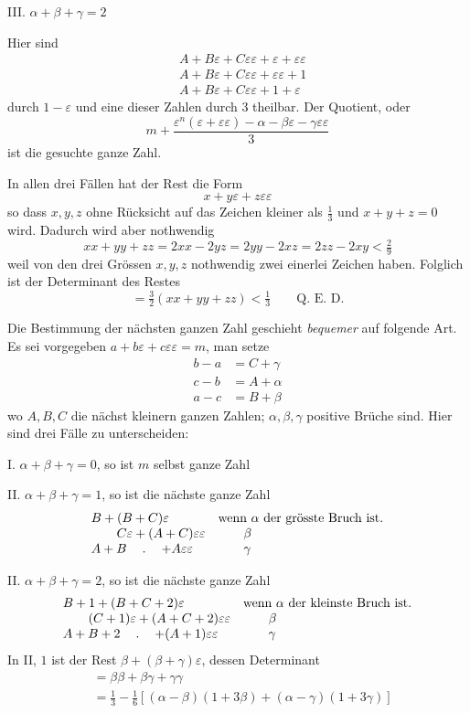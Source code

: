 III. $\alpha+\beta+\gamma=2$

Hier sind
\[
\begin{aligned}
&A+B\varepsilon+C\varepsilon\varepsilon+\varepsilon+\varepsilon\varepsilon\\
&A+B\varepsilon+C\varepsilon\varepsilon+\varepsilon\varepsilon+1\\
&A+B\varepsilon+C\varepsilon\varepsilon+1+\varepsilon
\end{aligned}
\]
durch $1-\varepsilon$ und eine dieser Zahlen durch $3$ theilbar. Der Quotient, oder
\[
m+\frac{\varepsilon^n(\varepsilon+\varepsilon\varepsilon)-\alpha-\beta\varepsilon-\gamma\varepsilon\varepsilon}{3}
\]
ist die gesuchte ganze Zahl.

In allen drei Fällen hat der Rest die Form
\[
x+y\varepsilon+z\varepsilon\varepsilon
\]
so dass $x,y,z$ ohne Rücksicht auf das Zeichen kleiner als $\frac13$ und $x+y+z=0$ wird. Dadurch wird aber nothwendig
\[
xx+yy+zz=2xx-2yz=2yy-2xz=2zz-2xy<\tfrac29
\]
weil von den drei Grössen $x,y,z$ nothwendig zwei einerlei Zeichen haben. Folglich ist der Determinant des Restes
\[
=\tfrac32(xx+yy+zz)<\tfrac13\qquad\text{Q. E. D.}
\]

Die Bestimmung der nächsten ganzen Zahl geschieht \emph{bequemer} auf folgende Art. Es sei vorgegeben $a+b\varepsilon+c\varepsilon\varepsilon=m$, man setze
\[
\begin{aligned}
b-a&=C+\gamma\\
c-b&=A+\alpha\\
a-c&=B+\beta
\end{aligned}
\]
wo $A,B,C$ die nächst kleinern ganzen Zahlen; $\alpha,\beta,\gamma$ positive Brüche sind.
Hier sind drei Fälle zu unterscheiden:

%
I. $\alpha+\beta+\gamma=0$, so ist $m$ selbst ganze Zahl

II. $\alpha+\beta+\gamma=1$, so ist die nächste ganze Zahl
\[
\begin{array}{ll}
B+(B+C)\varepsilon&\text{wenn }\alpha\text{ der grösste Bruch ist.}\\
\qquad C\varepsilon+(A+C)\varepsilon\varepsilon&\qquad\beta\\
A+B\quad\mathbin{.}\quad+A\varepsilon\varepsilon&\qquad\gamma
\end{array}
\]

II. $\alpha+\beta+\gamma=2$, so ist die nächste ganze Zahl
\[
\begin{array}{ll}
B+1+(B+C+2)\varepsilon&\text{wenn }\alpha\text{ der kleinste Bruch ist.}\\
\qquad(C+1)\varepsilon+(A+C+2)\varepsilon\varepsilon&\qquad\beta\\
A+B+2\quad\mathbin{.}\quad+(A+1)\varepsilon\varepsilon&\qquad\gamma
\end{array}
\]
In II, $1$ ist der Rest $\beta+(\beta+\gamma)\varepsilon$, dessen Determinant
\[
\begin{aligned}
&=\beta\beta+\beta\gamma+\gamma\gamma\\
&=\tfrac13-\tfrac16[(\alpha-\beta)(1+3\beta)+(\alpha-\gamma)(1+3\gamma)]
\end{aligned}
\]

